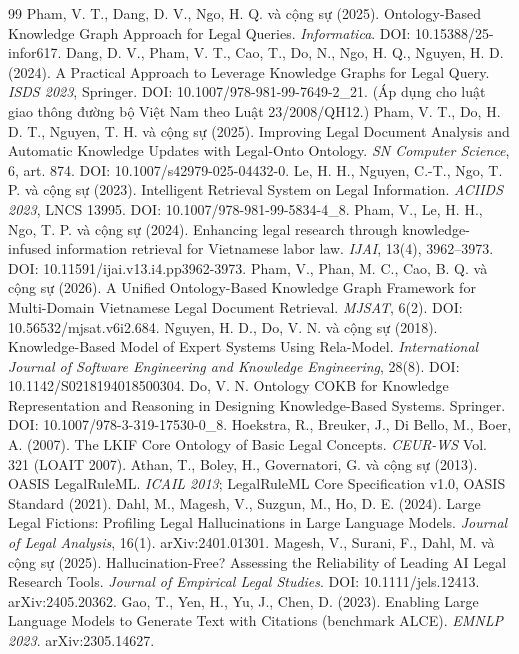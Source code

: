 {\begin{thebibliography}{99}
 Pham, V. T., Dang, D. V., Ngo, H. Q. và cộng sự (2025). Ontology-Based Knowledge Graph Approach for Legal Queries. \emph{Informatica}. DOI: 10.15388/25-infor617.
 Dang, D. V., Pham, V. T., Cao, T., Do, N., Ngo, H. Q., Nguyen, H. D. (2024). A Practical Approach to Leverage Knowledge Graphs for Legal Query. \emph{ISDS 2023}, Springer. DOI: 10.1007/978-981-99-7649-2\_21. (Áp dụng cho luật giao thông đường bộ Việt Nam theo Luật 23/2008/QH12.)
 Pham, V. T., Do, H. D. T., Nguyen, T. H. và cộng sự (2025). Improving Legal Document Analysis and Automatic Knowledge Updates with Legal-Onto Ontology. \emph{SN Computer Science}, 6, art. 874. DOI: 10.1007/s42979-025-04432-0.
 Le, H. H., Nguyen, C.-T., Ngo, T. P. và cộng sự (2023). Intelligent Retrieval System on Legal Information. \emph{ACIIDS 2023}, LNCS 13995. DOI: 10.1007/978-981-99-5834-4\_8.
 Pham, V., Le, H. H., Ngo, T. P. và cộng sự (2024). Enhancing legal research through knowledge-infused information retrieval for Vietnamese labor law. \emph{IJAI}, 13(4), 3962--3973. DOI: 10.11591/ijai.v13.i4.pp3962-3973.
 Pham, V., Phan, M. C., Cao, B. Q. và cộng sự (2026). A Unified Ontology-Based Knowledge Graph Framework for Multi-Domain Vietnamese Legal Document Retrieval. \emph{MJSAT}, 6(2). DOI: 10.56532/mjsat.v6i2.684.
 Nguyen, H. D., Do, V. N. và cộng sự (2018). Knowledge-Based Model of Expert Systems Using Rela-Model. \emph{International Journal of Software Engineering and Knowledge Engineering}, 28(8). DOI: 10.1142/S0218194018500304.
 Do, V. N. Ontology COKB for Knowledge Representation and Reasoning in Designing Knowledge-Based Systems. Springer. DOI: 10.1007/978-3-319-17530-0\_8.
 Hoekstra, R., Breuker, J., Di Bello, M., Boer, A. (2007). The LKIF Core Ontology of Basic Legal Concepts. \emph{CEUR-WS} Vol. 321 (LOAIT 2007).
 Athan, T., Boley, H., Governatori, G. và cộng sự (2013). OASIS LegalRuleML. \emph{ICAIL 2013}; LegalRuleML Core Specification v1.0, OASIS Standard (2021).
 Dahl, M., Magesh, V., Suzgun, M., Ho, D. E. (2024). Large Legal Fictions: Profiling Legal Hallucinations in Large Language Models. \emph{Journal of Legal Analysis}, 16(1). arXiv:2401.01301.
 Magesh, V., Surani, F., Dahl, M. và cộng sự (2025). Hallucination-Free? Assessing the Reliability of Leading AI Legal Research Tools. \emph{Journal of Empirical Legal Studies}. DOI: 10.1111/jels.12413. arXiv:2405.20362.
 Gao, T., Yen, H., Yu, J., Chen, D. (2023). Enabling Large Language Models to Generate Text with Citations (benchmark ALCE). \emph{EMNLP 2023}. arXiv:2305.14627.

\end{thebibliography}}
